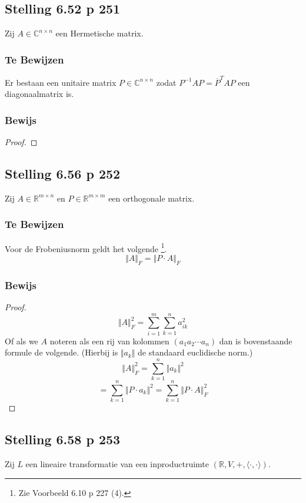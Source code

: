\documentclass[lineaire_algebra_oplossingen.tex]{subfiles}
\begin{document}
\subsection{Stelling 6.52 p 251}
\label{6.52}
Zij $A \in \mathbb{C}^{n\times n}$ een Hermetische matrix.

\subsubsection*{Te Bewijzen}
Er bestaan een unitaire matrix $P \in \mathbb{C}^{n\times n}$ zodat $P^{-1}AP = \overline{P}^TAP$ een diagonaalmatrix is.

\subsubsection*{Bewijs}
\begin{proof}
\end{proof}


\subsection{Stelling 6.56 p 252}
\label{6.56}
Zij $A \in \mathbb{R}^{m\times n}$ en $P \in \mathbb{R}^{m\times m}$ een orthogonale matrix.

\subsubsection*{Te Bewijzen}
Voor de Frobeniusnorm geldt het volgende \footnote{Zie Voorbeeld 6.10 p 227 (4).}.
\[
\Vert A\Vert_F = \Vert P\cdot A\Vert_F
\]

\subsubsection*{Bewijs}
\begin{proof}
\[
\Vert A\Vert_F^2 = \sum_{i=1}^m\sum_{k=1}^na_{ik}^2
\]
Of als we $A$ noteren als een rij van kolommen $(a_1 a_2 \cdots a_n)$ dan is bovenstaande formule de volgende. (Hierbij is $\Vert a_{k}\Vert$ de standaard euclidische norm.)
\[
\Vert A\Vert_F^2 = \sum_{k=1}^n\Vert a_{k}\Vert^2
\]
\[
 = \sum_{k=1}^n\Vert P\cdot a_{k}\Vert^2
  = \sum_{k=1}^n\Vert P\cdot A\Vert^2_F
\]
\end{proof}


\subsection{Stelling 6.58 p 253}
\label{6.58}
Zij $L$ een lineaire transformatie van een inproductruimte $(\mathbb{R},V,+,\langle \cdot,\cdot \rangle)$.
\end{document}
